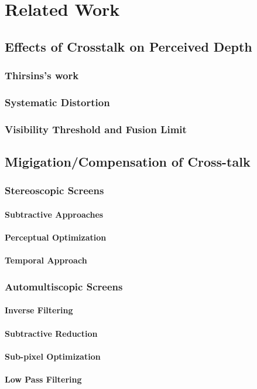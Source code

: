 \chapter{Related Work}
\label{chap:relatedWork}

\section{Effects of Crosstalk on Perceived Depth}

\subsection{Thirsins's work}

\subsection{Systematic Distortion}

\subsection{Visibility Threshold and Fusion Limit}

\section{Migigation/Compensation of Cross-talk}

\subsection{Stereoscopic Screens}
\subsubsection{Subtractive Approaches}
\subsubsection{Perceptual Optimization}
\subsubsection{Temporal Approach}

\subsection{Automultiscopic Screens}
\subsubsection{Inverse Filtering}
\subsubsection{Subtractive Reduction}
\subsubsection{Sub-pixel Optimization}
\subsubsection{Low Pass Filtering}